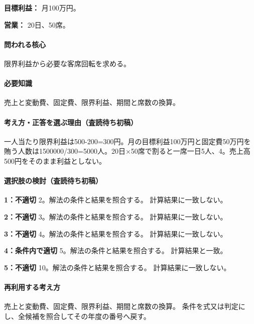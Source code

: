 \noindent\textbf{目標利益：} 月100万円。\par

\noindent\textbf{営業：} 20日、50席。\par

\paragraph{問われる核心} 限界利益から必要な客席回転を求める。

\paragraph{必要知識} 売上と変動費、固定費、限界利益、期間と席数の換算。

\paragraph{考え方・正答を選ぶ理由（査読待ち初稿）} 一人当たり限界利益は500-200=\allowbreak{}300円。月の目標利益100万円と固定費50万円を賄う人数は1500000/300=\allowbreak{}5000人。20日×50席で割ると一席一日5人、4。売上高500円をそのまま利益としない。

\paragraph{選択肢の検討（査読待ち初稿）}\mbox{}\par

\noindent\textbf{1：不適切} 2。解法の条件と結果を照合する。 計算結果に一致しない。\par

\noindent\textbf{2：不適切} 3。解法の条件と結果を照合する。 計算結果に一致しない。\par

\noindent\textbf{3：不適切} 4。解法の条件と結果を照合する。 計算結果に一致しない。\par

\noindent\textbf{4：条件内で適切} 5。解法の条件と結果を照合する。 計算結果と一致。\par

\noindent\textbf{5：不適切} 10。解法の条件と結果を照合する。 計算結果に一致しない。\par

\paragraph{再利用する考え方} 売上と変動費、固定費、限界利益、期間と席数の換算。 条件を式又は判定にし、全候補を照合してその年度の番号へ戻す。


